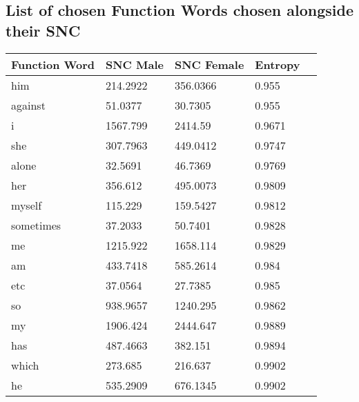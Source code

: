 \subsection*{List of chosen Function Words chosen alongside their SNC}
\begin{table}[H]
	\small
	\begin{tabular}{@{}lllll@{}}
		\toprule
		\textbf{Function Word} & \textbf{SNC Male} & \textbf{SNC Female} & \textbf{Entropy} &  \\ \midrule
		him           & 214.2922               & 356.0366                 & 0.955            &  \\
		against       & 51.0377                & 30.7305                  & 0.955            &  \\
		i             & 1567.799               & 2414.59                  & 0.9671           &  \\
		she           & 307.7963               & 449.0412                 & 0.9747           &  \\
		alone         & 32.5691                & 46.7369                  & 0.9769           &  \\
		her           & 356.612                & 495.0073                 & 0.9809           &  \\
		myself        & 115.229                & 159.5427                 & 0.9812           &  \\
		sometimes     & 37.2033                & 50.7401                  & 0.9828           &  \\
		me            & 1215.922               & 1658.114                 & 0.9829           &  \\
		am            & 433.7418               & 585.2614                 & 0.984            &  \\
		etc           & 37.0564                & 27.7385                  & 0.985            &  \\
		so            & 938.9657               & 1240.295                 & 0.9862           &  \\
		my            & 1906.424               & 2444.647                 & 0.9889           &  \\
		has           & 487.4663               & 382.151                  & 0.9894           &  \\
		which         & 273.685                & 216.637                  & 0.9902           &  \\
		he            & 535.2909               & 676.1345                 & 0.9902           &  \\

\end{tabular}
\end{table}
